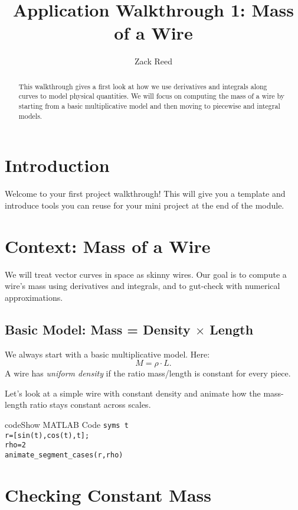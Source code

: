 \documentclass{ximera}
\title{Application Walkthrough 1: Mass of a Wire}
\author{Zack Reed}
\begin{document}
\begin{abstract}
This walkthrough gives a first look at how we use derivatives and integrals along curves to model physical quantities. We will focus on computing the mass of a wire by starting from a basic multiplicative model and then moving to piecewise and integral models.
\end{abstract}
\maketitle

\section*{Introduction}

Welcome to your first project walkthrough!
This will give you a template and introduce tools you can reuse for your mini project at the end of the module.

\section*{Context: Mass of a Wire}

We will treat vector curves in space as skinny wires. Our goal is to compute a wire's mass using derivatives and integrals, and to gut-check with numerical approximations.

\subsection*{Basic Model: Mass = Density $\times$ Length}

We always start with a basic multiplicative model. Here:
\[
M = \rho \cdot L.
\]
A wire has \emph{uniform density} if the ratio mass/length is constant for every piece.

Let's look at a simple wire with constant density and animate how the mass-length ratio stays constant across scales.

\begin{expandable}{code}{Show MATLAB Code}
\texttt{syms t}\\
\texttt{r=[\;sin(t),\;cos(t),\;t\;];}\\
\texttt{rho=2}\\
\texttt{animate\_segment\_cases(r,\;rho)}
\end{expandable}

\section*{Checking Constant Mass}
\end{document}
